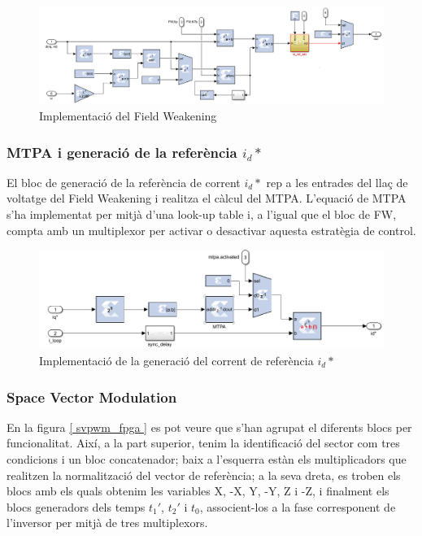 {{        \begin{figure}[!htb]
            \centering
            \captionsetup{justification=centering, margin=1.5cm}
            \includegraphics[width=14cm]
                { img/4_implementacio/fw.png }
            \caption{ Implementació del Field Weakening }
        \end{figure}
    }

    \subsubsection{ MTPA i generació de la referència $i_d*$ }
    { 
        El bloc de generació de la referència de corrent $i_d*$ rep a les
        entrades del llaç de voltatge del Field Weakening i realitza el càlcul
        del MTPA. L'equació de MTPA s'ha implementat per mitjà d'una look-up
        table i, a l'igual que el bloc de FW, compta amb un multiplexor per
        activar o desactivar aquesta estratègia de control.

        \begin{figure}[!htb]
            \centering
            \captionsetup{justification=centering, margin=1.5cm}
            \includegraphics[width=12cm]
                { img/4_implementacio/mtpa.png }
            \caption{ Implementació de la generació del corrent de referència $i_d*$ }
        \end{figure}
    }

    \subsubsection{ Space Vector Modulation }
    { 
        En la figura \ref{ svpwm_fpga } es pot veure que s'han agrupat el
        diferents blocs per funcionalitat. Així, a la part superior, tenim la
        identificació del sector com tres condicions i un bloc concatenador;
        baix a l'esquerra estàn els multiplicadors que realitzen la
        normalització del vector de referència; a la seva dreta, es troben els
        blocs amb els quals obtenim les variables X, -X, Y, -Y, Z i -Z, i
        finalment els blocs generadors dels temps $t_1'$, $t_2'$ i $t_0$,
        associent-los a la fase corresponent de l'inversor per mitjà de tres
        multiplexors. 

}}
